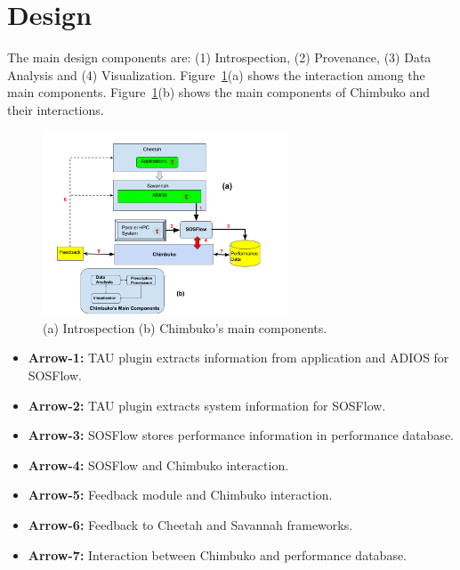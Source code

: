 \section{Design}
The main design components are: (1) Introspection, (2) Provenance, (3) Data Analysis and (4) Visualization. 
Figure~\ref{designfig:1}(a) shows the interaction among the main components. Figure~\ref{designfig:1}(b) shows the main components of Chimbuko and their interactions.

\begin{figure}[th!]
 \centering
  \includegraphics[width=0.65\textwidth]{Figs/Online_Chimbuko}
 \caption{(a) Introspection (b) Chimbuko's main components.}
\label{designfig:1}     
 \end{figure}

\begin{itemize}
\item {\bf{Arrow-1:}} TAU plugin extracts information from application and ADIOS for SOSFlow. 
\item {\bf{Arrow-2:}} TAU plugin extracts system information for SOSFlow.
\item {\bf{Arrow-3:}} SOSFlow stores performance information in performance database.
\item{\bf{ Arrow-4:}} SOSFlow and Chimbuko interaction.
\item {\bf{Arrow-5:}} Feedback module and Chimbuko interaction.
\item {\bf{Arrow-6:}} Feedback to Cheetah and Savannah frameworks.
\item {\bf{Arrow-7:}} Interaction between Chimbuko and performance database.
\end{itemize}

